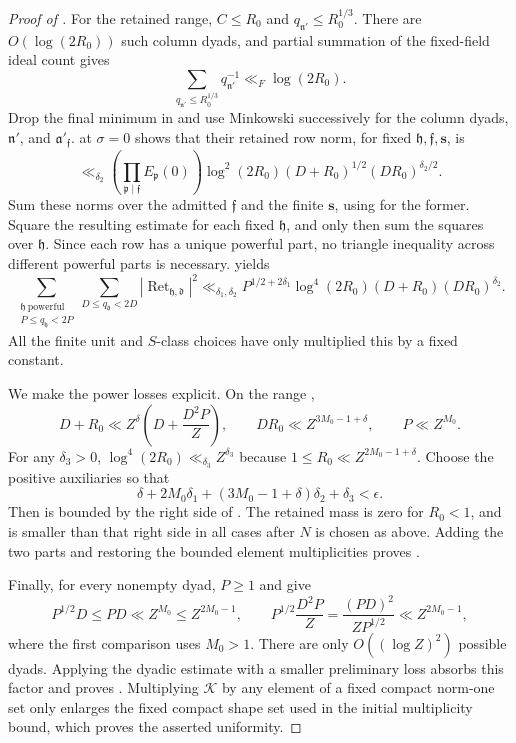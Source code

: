 \begin{proof}[Proof of ]
For the retained range, $C\leq R_0$ and
$q_{\mathfrak n'}\leq R_0^{1/3}$.  There are $O(\log(2R_0))$ such column
dyads, and partial summation of the fixed-field ideal count gives
\[
 \sum_{q_{\mathfrak n'}\leq R_0^{1/3}}q_{\mathfrak n'}^{-1}
       \ll_F\log(2R_0).
\]
Drop the final minimum in  and use
Minkowski successively for the column dyads, $\mathfrak n'$, and
$\mathfrak a'_{\mathfrak f}$.
 at $\sigma=0$ shows that their
retained row norm, for fixed \(\mathfrak h,\mathfrak f,\mathbf s\), is
\[
 \ll_{\delta_2}
 \left(\prod_{\mathfrak p\mid\mathfrak f}E_{\mathfrak p}(0)\right)
 \log^2(2R_0)(D+R_0)^{1/2}(DR_0)^{\delta_2/2}.
\]
Sum these norms over the admitted \(\mathfrak f\) and the finite
\(\mathbf s\), using  for the former.
Square the resulting estimate for each fixed \(\mathfrak h\), and only
then sum the squares over \(\mathfrak h\).  Since each row has a unique powerful part, no triangle
inequality across different powerful parts is necessary.
 yields
\begin{equation}\label{eq:reflection-retained-mass}
 \sum_{\substack{\mathfrak h\ \mathrm{powerful}\\P\leq q_{\mathfrak h}<2P}}
 \sum_{D\leq q_{\mathfrak d}<2D}
   |\operatorname{Ret}_{\mathfrak h,\mathfrak d}|^2
 \ll_{\delta_1,\delta_2}
 P^{1/2+2\delta_1}\log^4(2R_0)(D+R_0)(DR_0)^{\delta_2}.
\end{equation}
All the finite unit and $S$-class choices have only multiplied this by a
fixed constant.

We make the power losses explicit.  On the range
,
\[
 D+R_0\ll Z^\delta\left(D+\frac{D^2P}{Z}\right),\qquad
 DR_0\ll Z^{3M_0-1+\delta},\qquad P\ll Z^{M_0}.
\]
For any $\delta_3>0$, $\log^4(2R_0)\ll_{\delta_3}Z^{\delta_3}$ because
$1\leq R_0\ll Z^{2M_0-1+\delta}$.  Choose the positive auxiliaries so that
\[
 \delta+2M_0\delta_1+(3M_0-1+\delta)\delta_2+\delta_3<\epsilon.
\]
Then  is bounded by the right side of
.  The retained mass is zero for $R_0<1$,
and  is smaller than that right side in all
cases after $N$ is chosen as above.  Adding the two parts and restoring the
bounded element multiplicities proves .

Finally, for every nonempty dyad, $P\geq1$ and
 give
\[
 P^{1/2}D\leq PD\ll Z^{M_0}\leq Z^{2M_0-1},\qquad
 P^{1/2}\frac{D^2P}{Z}
       =\frac{(PD)^2}{ZP^{1/2}}\ll Z^{2M_0-1},
\]
where the first comparison uses $M_0>1$.  There are only $O((\log Z)^2)$
possible dyads.  Applying the dyadic estimate with a smaller preliminary
loss absorbs this factor and proves .
Multiplying $\mathscr K$ by any element of a fixed compact norm-one set
only enlarges the fixed compact shape set used in the initial multiplicity
bound, which proves the asserted uniformity.
\end{proof}
